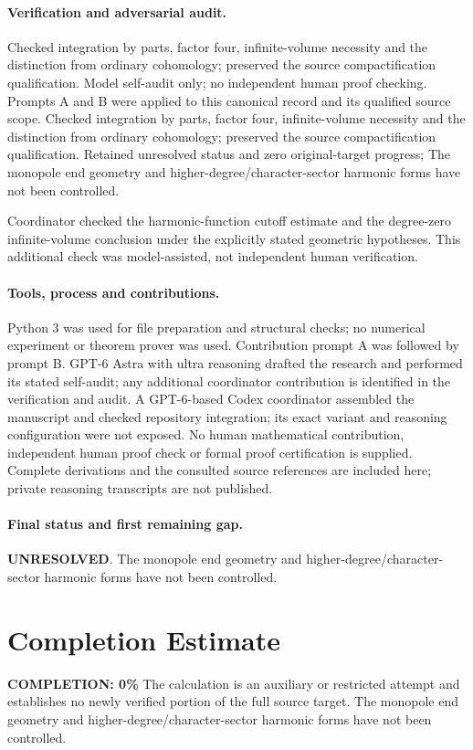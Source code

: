 \documentclass[11pt]{article}
\begin{document}
\paragraph{Verification and adversarial audit.}
Checked integration by parts, factor four, infinite-volume necessity and the distinction from ordinary cohomology; preserved the source compactification qualification. Model self-audit only; no independent human proof checking. Prompts A and B were applied to this canonical record and its qualified source scope. Checked integration by parts, factor four, infinite-volume necessity and the distinction from ordinary cohomology; preserved the source compactification qualification. Retained unresolved status and zero original-target progress; The monopole end geometry and higher-degree/character-sector harmonic forms have not been controlled.

Coordinator checked the harmonic-function cutoff estimate and the degree-zero infinite-volume conclusion under the explicitly stated geometric hypotheses. This additional check was model-assisted, not independent human verification.

\paragraph{Tools, process and contributions.}
Python 3 was used for file preparation and structural checks; no numerical experiment or theorem prover was used. Contribution prompt A was followed by prompt B. GPT-6 Astra with ultra reasoning drafted the research and performed its stated self-audit; any additional coordinator contribution is identified in the verification and audit. A GPT-6-based Codex coordinator assembled the manuscript and checked repository integration; its exact variant and reasoning configuration were not exposed. No human mathematical contribution, independent human proof check or formal proof certification is supplied. Complete derivations and the consulted source references are included here; private reasoning transcripts are not published.

\paragraph{Final status and first remaining gap.}
\textbf{UNRESOLVED}. The monopole end geometry and higher-degree/character-sector harmonic forms have not been controlled.

\section{Completion Estimate}
\noindent\textbf{COMPLETION: 0\%}
The calculation is an auxiliary or restricted attempt and establishes no newly verified portion of the full source target. The monopole end geometry and higher-degree/character-sector harmonic forms have not been controlled.
\end{document}
